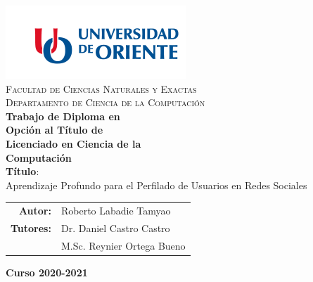\documentclass[11pt, letterpaper]{report}
\begin{document}
	\begin{titlepage}
	\begin{minipage}[t]{0.48\textwidth}
		\BgThispage
		\parbox{\textwidth}{}
	\end{minipage}
	\begin{minipage}[t]{0.55\textwidth}
			\parbox{\textwidth}{
				\includegraphics[width=.8\textwidth]{images/logo.png}\\[0.5cm]
				\centering\textsc{Facultad de Ciencias Naturales y Exactas}\\[0.2cm]
				\centering\textsc{Departamento de Ciencia de la Computación}\\[2.2cm]
				\textbf{\LARGE Trabajo de Diploma en\\[-.1cm]Opción al Título de\\[-.1cm]Licenciado en Ciencia de la\\[-.1cm]Computación\\[2.2cm]}
				\Large  \textbf{Título}:\\
				\fontsize{18pt}{20pt}\selectfont Aprendizaje Profundo para el Perfilado de Usuarios en Redes Sociales\\
				\vspace{10mm}
				\begin{tabular}{rp{}}
					{\Large \bf Autor:} & {\Large Roberto Labadie Tamyao} \\[.5cm]
					{\Large \bf Tutores:} & {\Large Dr. Daniel Castro Castro} \\[.5cm]
					& {\Large M.Sc. Reynier Ortega Bueno} \\[.5cm]
				\end{tabular}
				
				\vspace{10mm}
				{\Large \textbf{Curso 2020-2021}}
			}
	\end{minipage}
	\end{titlepage}
	
	\thispagestyle{empty} 	
	\chapterfont{\flushright}
	\renewcommand{\contentsname}{Contenido} \tableofcontents
	\renewcommand{\listfigurename}{Lista de Figuras}
	\renewcommand{\tablename}{Tabla}

	\listoffigures
	
	
	
	
	
	\renewcommand{\bibname}{Referencias Bibliográficas}
	
	
\end{document}

